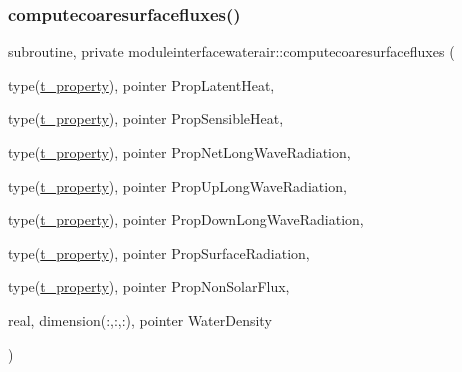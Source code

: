 \subsubsection{\texorpdfstring{computecoaresurfacefluxes()}{computecoaresurfacefluxes()}}
{\footnotesize\ttfamily subroutine, private moduleinterfacewaterair\+::computecoaresurfacefluxes (\begin{DoxyParamCaption}\item[{type(\mbox{\hyperlink{structmoduleinterfacewaterair_1_1t__property}{t\+\_\+property}}), pointer}]{Prop\+Latent\+Heat,  }\item[{type(\mbox{\hyperlink{structmoduleinterfacewaterair_1_1t__property}{t\+\_\+property}}), pointer}]{Prop\+Sensible\+Heat,  }\item[{type(\mbox{\hyperlink{structmoduleinterfacewaterair_1_1t__property}{t\+\_\+property}}), pointer}]{Prop\+Net\+Long\+Wave\+Radiation,  }\item[{type(\mbox{\hyperlink{structmoduleinterfacewaterair_1_1t__property}{t\+\_\+property}}), pointer}]{Prop\+Up\+Long\+Wave\+Radiation,  }\item[{type(\mbox{\hyperlink{structmoduleinterfacewaterair_1_1t__property}{t\+\_\+property}}), pointer}]{Prop\+Down\+Long\+Wave\+Radiation,  }\item[{type(\mbox{\hyperlink{structmoduleinterfacewaterair_1_1t__property}{t\+\_\+property}}), pointer}]{Prop\+Surface\+Radiation,  }\item[{type(\mbox{\hyperlink{structmoduleinterfacewaterair_1_1t__property}{t\+\_\+property}}), pointer}]{Prop\+Non\+Solar\+Flux,  }\item[{real, dimension(\+:,\+:,\+:), pointer}]{Water\+Density }\end{DoxyParamCaption})\hspace{0.3cm}{\ttfamily [private]}}

